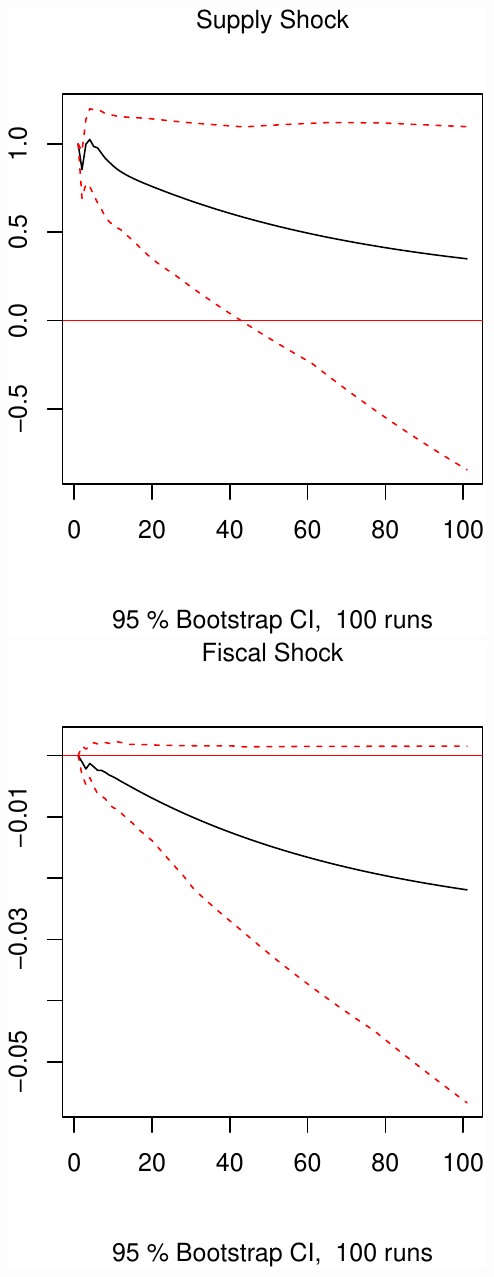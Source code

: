 \documentclass[11pt,preprint, authoryear]{elsarticle}
\numberwithin{equation}{section}
\numberwithin{figure}{section}
\numberwithin{table}{section}
\begin{document}
\includegraphics{TS_proj_files/figure-latex/unnamed-chunk-18-1.pdf}
\includegraphics{TS_proj_files/figure-latex/unnamed-chunk-18-2.pdf}
\end{document}

